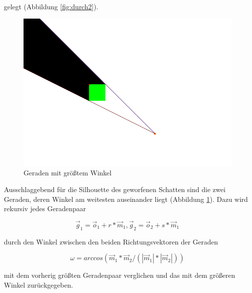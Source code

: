 gelegt (Abbildung \ref{fig:durch2}).

\begin{figure}[t]
	\centering
	\includegraphics[width=\columnwidth]{images/durchfuehrung_4.png}
	\caption{Geraden mit größtem Winkel}
	\label{fig:durch3}
\end{figure}


Ausschlaggebend für die Silhouette des geworfenen Schatten sind die zwei Geraden, deren Winkel am
weitesten auseinander liegt (Abbildung \ref{fig:durch3}). Dazu wird rekursiv jedes Geradenpaar

\begin{equation}
	\vec{g}_1 = \vec{o}_1 + r * \vec{m}_1, \vec{g}_2 = \vec{o}_2 + s * \vec{m}_1
\end{equation}

durch den Winkel zwischen den beiden Richtungsvektoren der Geraden

\begin{equation}
	\omega = arccos(\vec{m}_1 * \vec{m}_2 / (|\vec{m}_1| * |\vec{m}_2|))
\end{equation}

mit dem vorherig größten Geradenpaar verglichen und das mit dem größeren Winkel zurückgegeben.

